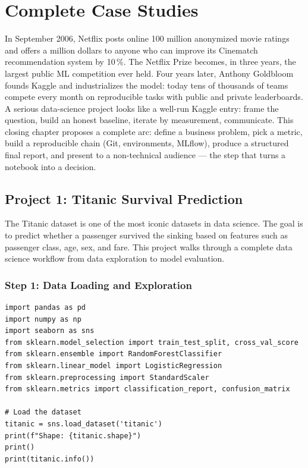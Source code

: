 \chapter{Complete Case Studies}
\label{ch:projets}

In September 2006, Netflix posts online 100 million anonymized movie ratings and offers a million dollars to anyone who can improve its Cinematch recommendation system by 10\,\%. The Netflix Prize becomes, in three years, the largest public ML competition ever held. Four years later, Anthony Goldbloom founds Kaggle and industrializes the model: today tens of thousands of teams compete every month on reproducible tasks with public and private leaderboards. A serious data-science project looks like a well-run Kaggle entry: frame the question, build an honest baseline, iterate by measurement, communicate. This closing chapter proposes a complete arc: define a business problem, pick a metric, build a reproducible chain (Git, environments, MLflow), produce a structured final report, and present to a non-technical audience --- the step that turns a notebook into a decision.

\section{Project 1: Titanic Survival Prediction}
\label{sec:projet_titanic}


\begin{intuition}
The Titanic dataset is one of the most iconic datasets in data science. The goal is to predict whether a passenger survived the sinking based on features such as passenger class, age, sex, and fare. This project walks through a complete data science workflow from data exploration to model evaluation.
\end{intuition}

\subsection{Step 1: Data Loading and Exploration}

\begin{codeblock}[title=\textbf{Python}]
\begin{verbatim}
import pandas as pd
import numpy as np
import seaborn as sns
from sklearn.model_selection import train_test_split, cross_val_score
from sklearn.ensemble import RandomForestClassifier
from sklearn.linear_model import LogisticRegression
from sklearn.preprocessing import StandardScaler
from sklearn.metrics import classification_report, confusion_matrix

# Load the dataset
titanic = sns.load_dataset('titanic')
print(f"Shape: {titanic.shape}")
print()
print(titanic.info())
\end{verbatim}
\end{codeblock}

